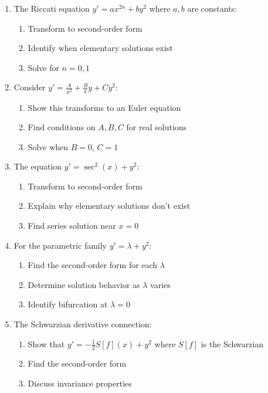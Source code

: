 \documentclass[12pt]{article}
\begin{document}
\begin{enumerate}[resume]
    \item The Riccati equation $y' = ax^{2n} + by^{2}$ where $a, b$ are constants:
    \begin{enumerate}[label=(\alph*)]
        \item Transform to second-order form
        \item Identify when elementary solutions exist
        \item Solve for $n = 0, 1$
    \end{enumerate}

    \item Consider $y' = \frac{A}{x^{2}} + \frac{B}{x}y + Cy^{2}$:
    \begin{enumerate}[label=(\alph*)]
        \item Show this transforms to an Euler equation
        \item Find conditions on $A, B, C$ for real solutions
        \item Solve when $B = 0$, $C = 1$
    \end{enumerate}

    \item The equation $y' = \sec^{2}(x) + y^{2}$:
    \begin{enumerate}[label=(\alph*)]
        \item Transform to second-order form
        \item Explain why elementary solutions don't exist
        \item Find series solution near $x = 0$
    \end{enumerate}

    \item For the parametric family $y' = \lambda + y^{2}$:
    \begin{enumerate}[label=(\alph*)]
        \item Find the second-order form for each $\lambda$
        \item Determine solution behavior as $\lambda$ varies
        \item Identify bifurcation at $\lambda = 0$
    \end{enumerate}

    \item The Schwarzian derivative connection:
    \begin{enumerate}[label=(\alph*)]
        \item Show that $y' = -\frac{1}{2}S[f](x) + y^{2}$ where $S[f]$ is the Schwarzian
        \item Find the second-order form
        \item Discuss invariance properties
    \end{enumerate}
\end{enumerate}
\end{document}
